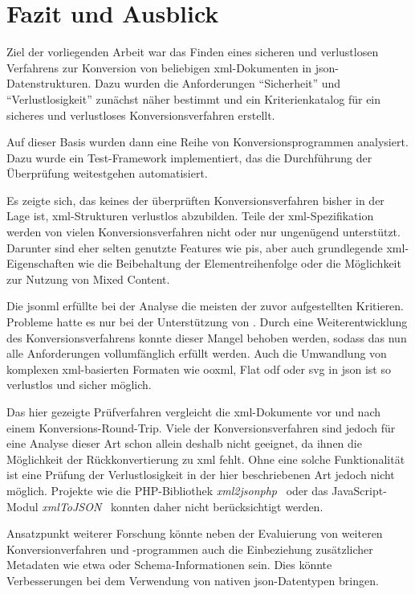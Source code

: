 \chapter{Fazit und Ausblick} \label{chap:conclusion}
Ziel der vorliegenden Arbeit war das Finden eines sicheren und verlustlosen Verfahrens zur Konversion von beliebigen \acrshort{xml}-Dokumenten in \acrshort{json}-Datenstrukturen. Dazu wurden die Anforderungen \enquote{Sicherheit} und \enquote{Verlustlosigkeit} zunächst näher bestimmt und ein Kriterienkatalog für ein sicheres und verlustloses Konversionsverfahren erstellt.

Auf dieser Basis wurden dann eine Reihe von Konversionsprogrammen analysiert. Dazu wurde ein Test-Framework implementiert, das die Durchführung der Überprüfung weitestgehen automatisiert.

Es zeigte sich, das keines der überprüften Konversionsverfahren bisher in der Lage ist, \acrshort{xml}-Strukturen verlustlos abzubilden. Teile der \acrshort{xml}-Spezifikation werden von vielen Konversionsverfahren nicht oder nur ungenügend unterstützt. Darunter sind eher selten genutzte Features wie \glspl{pi}, aber auch grundlegende \acrshort{xml}-Eigenschaften wie die Beibehaltung der Elementreihenfolge oder die Möglichkeit zur Nutzung von Mixed Content.

Die \acrfull{jsonml} erfüllte bei der Analyse die meisten der zuvor aufgestellten Kritieren. Probleme hatte es nur bei der Unterstützung von . Durch eine Weiterentwicklung des Konversionsverfahrens konnte dieser Mangel behoben werden, sodass das nun alle Anforderungen vollumfänglich erfüllt werden. Auch die Umwandlung von komplexen \acrshort{xml}-basierten Formaten wie \gls{ooxml}, Flat \gls{odf} oder \gls{svg} in \acrshort{json} ist so verlustlos und sicher möglich.

Das hier gezeigte Prüfverfahren vergleicht die \acrshort{xml}-Dokumente vor und nach einem Konversions-Round-Trip. Viele der Konversionsverfahren sind jedoch für eine Analyse dieser Art schon allein deshalb nicht geeignet, da ihnen die Möglichkeit der Rückkonvertierung zu \acrshort{xml} fehlt. Ohne eine solche Funktionalität ist eine Prüfung der Verlustlosigkeit in der hier beschriebenen Art jedoch nicht möglich. Projekte wie die PHP-Bibliothek \emph{xml2jsonphp}~\cite{xml2jsonphp} oder das JavaScript-Modul \emph{xmlToJSON}~\cite{metatribalxmltojson} konnten daher nicht berücksichtigt werden.

Ansatzpunkt weiterer Forschung könnte neben der Evaluierung von weiteren Konversionverfahren und -programmen auch die Einbeziehung zusätzlicher Metadaten wie etwa  oder Schema-Informationen sein. Dies könnte Verbesserungen bei dem Verwendung von nativen \acrshort{json}-Datentypen bringen.

